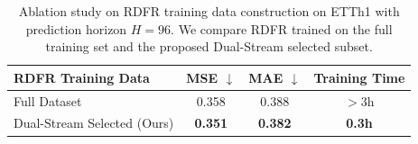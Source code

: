 \begin{table}[t]
\centering
\small
\caption{Ablation study on RDFR training data construction on ETTh1 with prediction horizon $H=96$.
We compare RDFR trained on the full training set and the proposed Dual-Stream selected subset.}
\label{tab:rdfr_data_construction_ablation}
\setlength{\tabcolsep}{10pt}
\begin{tabular}{lccc}
\toprule
\textbf{RDFR Training Data} & \textbf{MSE} $\downarrow$ & \textbf{MAE} $\downarrow$ & \textbf{Training Time} \\
\midrule
Full Dataset & 0.358 & 0.388 & $>3$h \\
Dual-Stream Selected (Ours) & \textbf{0.351} & \textbf{0.382} & \textbf{0.3h} \\
\bottomrule
\end{tabular}
\end{table}
